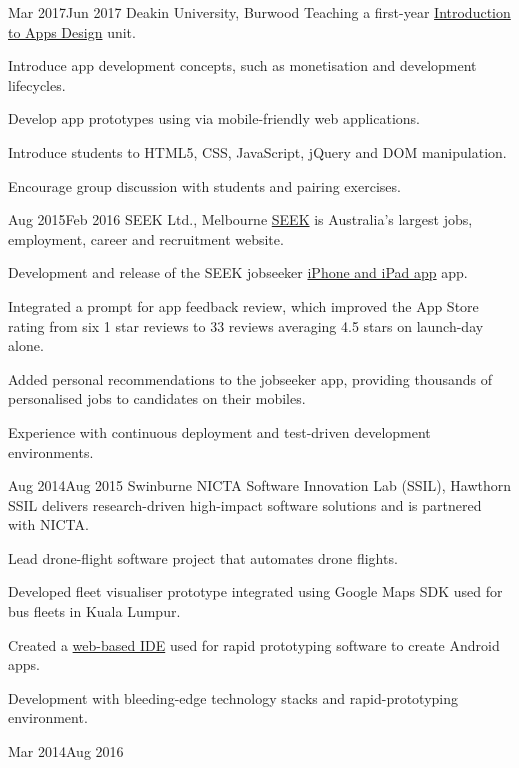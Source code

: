 {    
        {Mar 2017}{Jun 2017}
        {Deakin University, Burwood}
        {Teaching a first-year \href{http://www.deakin.edu.au/current-students-courses/unit.php?unit=SIT120}{Introduction to Apps Design} unit.}
        {
          \item Introduce app development concepts, such as monetisation and development lifecycles.
          \item Develop app prototypes using via mobile-friendly web applications.
          \item Introduce students to HTML5, CSS, JavaScript, jQuery and DOM manipulation.
          \item Encourage group discussion with students and pairing exercises.
        }
    \clearpage
        {Aug 2015}{Feb 2016}
        {SEEK Ltd., Melbourne}
        {\href{http://seek.com.au}{SEEK} is Australia's largest jobs, employment, career and recruitment website.}
        {
          \item Development and release of the SEEK jobseeker \href{https://itunes.apple.com/us/app/seek-jobs/id520400855?mt=8}{iPhone and iPad app} app.
          \item Integrated a prompt for app feedback review, which improved the App Store rating from six 1 star reviews to 33 reviews averaging 4.5 stars on launch-day alone.
          \item Added personal recommendations to the jobseeker app, providing thousands of personalised jobs to candidates on their mobiles.
          \item Experience with continuous deployment and test-driven development environments.
        }
        {Aug 2014}{Aug 2015}
        {Swinburne NICTA Software Innovation Lab (SSIL), Hawthorn}
        {SSIL delivers research-driven high-impact software solutions and is partnered with NICTA.}
        {
          \item Lead drone-flight software project that automates drone flights.
          \item Developed fleet visualiser prototype integrated using Google Maps SDK used for bus fleets in Kuala Lumpur.
          \item Created a \href{http://rappt.io/}{web-based IDE} used for rapid prototyping software to create Android apps.
          \item Development with bleeding-edge technology stacks and rapid-prototyping environment.
        }
        {Mar 2014}{Aug 2016}
}

